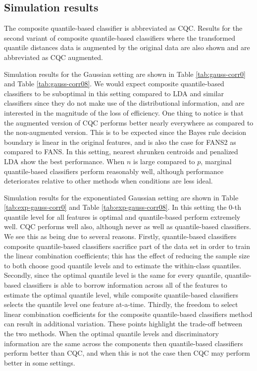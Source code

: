 \documentclass{article}
\begin{document}
\subsection{Simulation results}
\label{sec:simulation-results}

The composite quantile-based classifier is abbreviated as CQC.  Results for the
second variant of composite quantile-based classifiers where the transformed
quantile distances data is augmented by the original data are also shown and are
abbreviated as CQC augmented.

Simulation results for the Gaussian setting are shown in Table
\ref{tab:gauss-corr0} and Table \ref{tab:gauss-corr08}.  We would expect
composite quantile-based classifiers to be suboptimal in this setting compared
to LDA and similar classifiers since they do not make use of the distributional
information, and are interested in the magnitude of the loss of efficiency.  One
thing to notice is that the augmented version of CQC performs better nearly
everywhere as compared to the non-augmented version.  This is to be expected
since the Bayes rule decision boundary is linear in the original features, and
is also the case for FANS2 as compared to FANS.  In this setting, nearest
shrunken centroids and penalized LDA show the best performance.  When $n$ is
large compared to $p$, marginal quantile-based classifiers perform reasonably
well, although performance deteriorates relative to other methods when
conditions are less ideal.

Simulation results for the exponentiated Gaussian setting are shown in Table
\ref{tab:exp-gauss-corr0} and Table \ref{tab:exp-gauss-corr08}.  In this setting
the 0-th quantile level for all features is optimal and quantile-based perform
extremely well.  CQC performs well also, although never as well as
quantile-based classifiers.  We see this as being due to several reasons.
Firstly, quantile-based classifiers composite quantile-based classifiers
sacrifice part of the data set in order to train the linear combination
coefficients; this has the effect of reducing the sample size to both choose
good quantile levels and to estimate the within-class quantiles.  Secondly,
since the optimal quantile level is the same for every quantile, quantile-based
classifiers is able to borrow information across all of the features to estimate
the optimal quantile level, while composite quantile-based classifiers selects
the quantile level one feature at-a-time.  Thirdly, the freedom to select linear
combination coefficients for the composite quantile-based classifiers method can
result in additional variation.  These points highlight the trade-off between
the two methods.  When the optimal quantile levels and discriminatory
information are the same across the components then quantile-based classifiers
perform better than CQC, and when this is not the case then CQC may perform
better in some settings.
\end{document}
